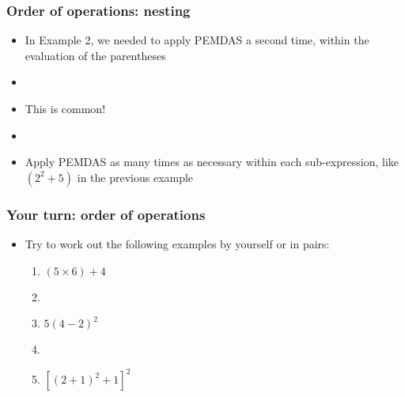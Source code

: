 \documentclass[12pt]{beamer}
\newcommand{\myframe}[1]{\begin{frame} \frametitle{#1}}
\begin{document}
\myframe{Order of operations: nesting}
\begin{itemize}
\item In Example 2, we needed to apply PEMDAS a second time, within the evaluation of the parentheses
\item[]
\item This is common!
\item[]
\item Apply PEMDAS as many times as necessary within each sub-expression, like $(2^2 + 5)$ in the previous example
\end{itemize}
\end{frame}

\myframe{Your turn: order of operations}
\begin{itemize}
\item Try to work out the following examples by yourself or in pairs:
\begin{enumerate}
\item $(5 \times 6) + 4$
\item[]
\item $5(4 - 2)^2$
\item[]
\item $[(2+1)^2 + 1]^2$
\end{enumerate}
\end{itemize}
\end{frame}
\end{document}
